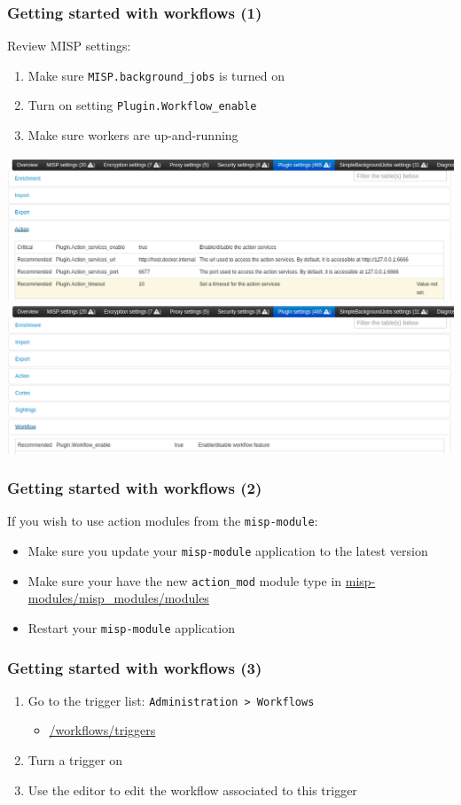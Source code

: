 \begin{frame}
    \frametitle{Getting started with workflows (1)}
    Review MISP settings:
    \begin{enumerate}
        \item Make sure \texttt{MISP.background\_jobs} is turned on
        \item Turn on setting \texttt{Plugin.Workflow\_enable}
        \item Make sure workers are up-and-running
    \end{enumerate}
    \begin{center}
        \includegraphics[width=0.75\linewidth]{pictures/settings-1.png}
        \includegraphics[width=0.75\linewidth]{pictures/settings-2.png}
    \end{center}
\end{frame}

\begin{frame}
    \frametitle{Getting started with workflows (2)}
    If you wish to use action modules from the \texttt{misp-module}:
    \begin{itemize}
        \item Make sure you update your \texttt{misp-module} application to the latest version
        \item Make sure your have the new \texttt{action\_mod} module type in \url{misp-modules/misp\_modules/modules}
        \item Restart your \texttt{misp-module} application
    \end{itemize}
\end{frame}

\begin{frame}
    \frametitle{Getting started with workflows (3)}
    \begin{enumerate}
        \item Go to the trigger list: \texttt{Administration > Workflows}
        \begin{itemize}
            \item \url{/workflows/triggers}
        \end{itemize}
        \item Turn a trigger on
        \item Use the editor to edit the workflow associated to this trigger
    \end{enumerate}
\end{frame}

